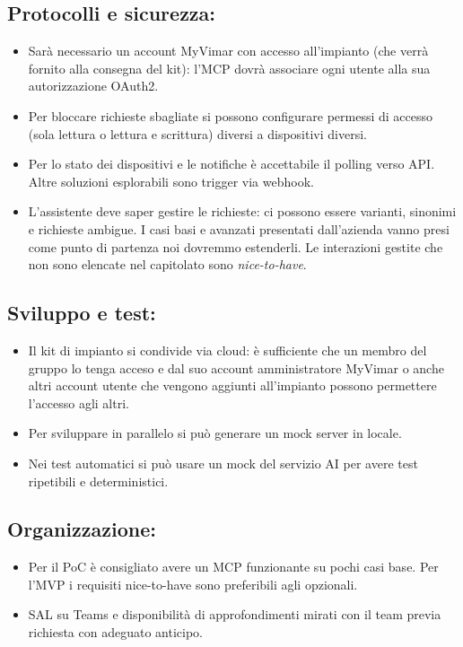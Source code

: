 \documentclass[a4paper, 11pt]{article}
\begin{document}
\subsection{Protocolli e sicurezza:}
\begin{itemize}
    \item Sarà necessario un account MyVimar con accesso all'impianto (che verrà fornito alla consegna del kit): l'MCP dovrà associare ogni utente alla sua autorizzazione OAuth2. \vspace{-0.1cm}
    \item Per bloccare richieste sbagliate si possono configurare permessi di accesso (sola lettura o lettura e scrittura) diversi a dispositivi diversi. \vspace{-0.1cm}
    \item Per lo stato dei dispositivi e le notifiche è accettabile il polling verso API. Altre soluzioni esplorabili sono trigger via webhook. \vspace{-0.1cm}
    \item L'assistente deve saper gestire le richieste: ci possono essere varianti, sinonimi e richieste ambigue. I casi basi e avanzati presentati dall'azienda vanno presi come punto di partenza noi dovremmo estenderli. 
          Le interazioni gestite che non sono elencate nel capitolato sono \textit{nice-to-have}. \vspace{-0.1cm}
\end{itemize}
\subsection{Sviluppo e test:}
\begin{itemize}
    \item Il kit di impianto si condivide via cloud: è sufficiente che un membro del gruppo lo tenga acceso e dal suo account amministratore MyVimar o anche altri account utente che vengono aggiunti all'impianto possono permettere l'accesso agli altri.\vspace{-0.1cm}
    \item Per sviluppare in parallelo si può generare un mock server in locale. \vspace{-0.1cm}
    \item Nei test automatici si può usare un mock del servizio AI per avere test ripetibili e deterministici. \vspace{-0.1cm}
\end{itemize}
\subsection{Organizzazione:}
\begin{itemize}
    \item Per il PoC è consigliato avere un MCP funzionante su pochi casi base. Per l'MVP i requisiti nice-to-have sono preferibili agli opzionali. \vspace{-0.1cm}
    \item SAL su Teams e disponibilità di approfondimenti mirati con il team previa richiesta con adeguato anticipo. \vspace{-0.1cm}
\end{itemize}
\end{document}
